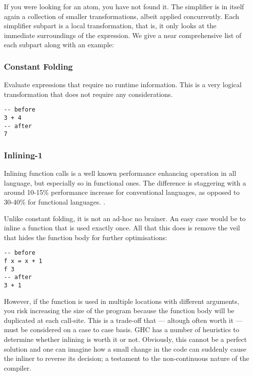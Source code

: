 If you were looking for an atom, you have not found it. The simplifier is in itself again a collection of smaller transformations,
albeit applied concurrently. Each simplifier subpart is a local transformation, that is, it only looks at the immediate
surroundings of the expression. We give a near comprehensive list of each subpart along with an example:

\subsubsection{Constant Folding}
Evaluate expressions that require no runtime information. This is a very logical transformation that does not
require any considerations.

\begin{listing}[H]
\begin{verbatim}
-- before
3 + 4
-- after
7
\end{verbatim}
\end{listing}

\subsubsection{Inlining-1}

Inlining function calls is a well known performance enhancing operation in all language, but especially so in functional ones.
The difference is staggering with a around 10-15\% performance increase for conventional languages, as opposed to
30-40\% for functional languages. \cite{haskell_optimisations_1997} \cite{c_inliner}.

Unlike constant folding, it is not an ad-hoc no brainer. An easy case would be to inline a function that is
used exactly once. All that this does is remove the veil that hides the function body for further optimisations:

\begin{listing}[H]
\begin{verbatim}
-- before
f x = x + 1
f 3
-- after
3 + 1
\end{verbatim}
\end{listing}

However, if the function is used in multiple locations with different arguments, you risk increasing the size of the program
because the function body will be duplicated at each call-site. This is a trade-off that --- altough often worth it --- must be
considered on a case to case basis. GHC has a number of heuristics to determine whether inlining is worth it or not. Obviously,
this cannot be a perfect solution and one can imagine how a small change in the code can suddenly cause the inliner to reverse
its decision; a testament to the non-continuous nature of the compiler.

